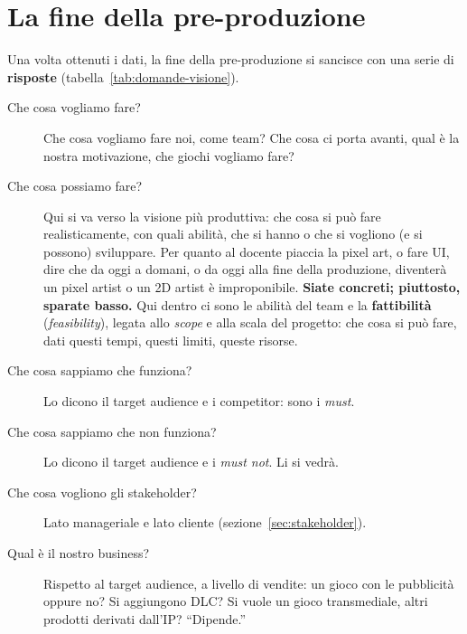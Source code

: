 \section{La fine della pre-produzione}
\label{sec:fine-preproduzione}



Una volta ottenuti i dati, la fine della pre-produzione si sancisce con una
serie di \textbf{risposte} (tabella~\ref{tab:domande-visione}).
\begin{description}
  \item[Che cosa vogliamo fare?] Che cosa vogliamo fare noi, come team? Che
        cosa ci porta avanti, qual è la nostra motivazione, che giochi
        vogliamo fare?
  \item[Che cosa possiamo fare?] Qui si va verso la visione più produttiva:
        che cosa si può fare realisticamente, con quali abilità, che si hanno
        o che si vogliono (e si possono) sviluppare. Per quanto al docente
        piaccia la pixel art, o fare UI, dire che da oggi a domani, o da oggi
        alla fine della produzione, diventerà un pixel artist o un 2D artist è
        improponibile. \textbf{Siate concreti; piuttosto, sparate basso.} Qui
        dentro ci sono le abilità del team e la \textbf{fattibilità}
        (\emph{feasibility}), legata allo \emph{scope} e alla scala del
        progetto: che cosa si può fare, dati questi tempi, questi limiti,
        queste risorse.
  \item[Che cosa sappiamo che funziona?] Lo dicono il target audience e i
        competitor: sono i \emph{must}.
  \item[Che cosa sappiamo che non funziona?] Lo dicono il target audience e i
        \emph{must not}. Li si vedrà.
  \item[Che cosa vogliono gli stakeholder?] Lato manageriale e lato cliente
        (sezione~\ref{sec:stakeholder}).
  \item[Qual è il nostro business?] Rispetto al target audience, a livello di
        vendite: un gioco con le pubblicità oppure no? Si aggiungono DLC? Si
        vuole un gioco transmediale, altri prodotti derivati dall'IP?
        ``Dipende.''
\end{description}

